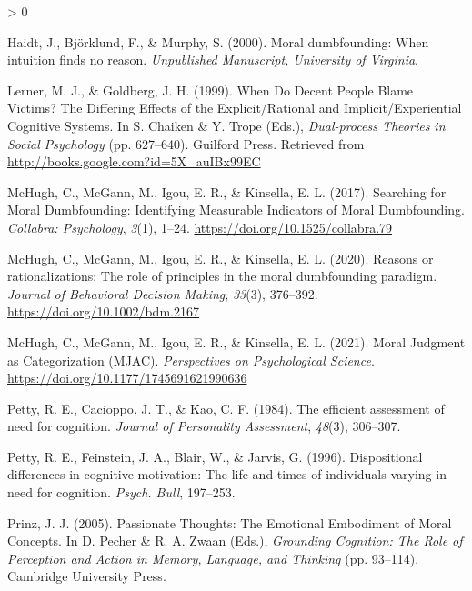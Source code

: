 \documentclass[
  american,
  man,floatsintext]{apa7}
\newlength{\cslhangindent}
\newenvironment{CSLReferences}[2] %
 {%
  \setlength{\parindent}{0pt}
  \ifodd #1 \everypar{\setlength{\hangindent}{\cslhangindent}}\ignorespaces\fi
  \ifnum #2 > 0
  \setlength{\parskip}{#2\baselineskip}
  \fi
 }%
 {}
\begin{document}
\begin{CSLReferences}{1}{0}
\leavevmode\hypertarget{ref-haidt_moral_2000}{}%
Haidt, J., Björklund, F., \& Murphy, S. (2000). Moral dumbfounding: When intuition finds no reason. \emph{Unpublished Manuscript, University of Virginia}.

\leavevmode\hypertarget{ref-lerner_when_1999}{}%
Lerner, M. J., \& Goldberg, J. H. (1999). When {Do Decent People Blame Victims}? The {Differing Effects} of the {Explicit}/{Rational} and {Implicit}/{Experiential Cognitive Systems}. In S. Chaiken \& Y. Trope (Eds.), \emph{Dual-process {Theories} in {Social Psychology}} (pp. 627--640). {Guilford Press}. Retrieved from \url{http://books.google.com?id=5X_auIBx99EC}

\leavevmode\hypertarget{ref-mchugh_searching_2017a}{}%
McHugh, C., McGann, M., Igou, E. R., \& Kinsella, E. L. (2017). Searching for {Moral Dumbfounding}: Identifying {Measurable Indicators} of {Moral Dumbfounding}. \emph{Collabra: Psychology}, \emph{3}(1), 1--24. \url{https://doi.org/10.1525/collabra.79}

\leavevmode\hypertarget{ref-mchugh_reasons_2020}{}%
McHugh, C., McGann, M., Igou, E. R., \& Kinsella, E. L. (2020). Reasons or rationalizations: The role of principles in the moral dumbfounding paradigm. \emph{Journal of Behavioral Decision Making}, \emph{33}(3), 376--392. \url{https://doi.org/10.1002/bdm.2167}

\leavevmode\hypertarget{ref-mchugh_moral_2021}{}%
McHugh, C., McGann, M., Igou, E. R., \& Kinsella, E. L. (2021). Moral {Judgment} as {Categorization} ({MJAC}). \emph{Perspectives on Psychological Science}. \url{https://doi.org/10.1177/1745691621990636}

\leavevmode\hypertarget{ref-petty_efficient_1984}{}%
Petty, R. E., Cacioppo, J. T., \& Kao, C. F. (1984). The efficient assessment of need for cognition. \emph{Journal of Personality Assessment}, \emph{48}(3), 306--307.

\leavevmode\hypertarget{ref-petty_dispositional_1996}{}%
Petty, R. E., Feinstein, J. A., Blair, W., \& Jarvis, G. (1996). Dispositional differences in cognitive motivation: The life and times of individuals varying in need for cognition. \emph{Psych. Bull}, 197--253.

\leavevmode\hypertarget{ref-prinz_passionate_2005}{}%
Prinz, J. J. (2005). Passionate {Thoughts}: The {Emotional Embodiment} of {Moral Concepts}. In D. Pecher \& R. A. Zwaan (Eds.), \emph{Grounding {Cognition}: The {Role} of {Perception} and {Action} in {Memory}, {Language}, and {Thinking}} (pp. 93--114). {Cambridge University Press}.


\end{CSLReferences}
\end{document}
